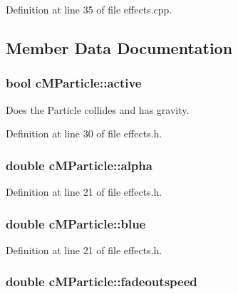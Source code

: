 Definition at line 35 of file effects.\-cpp.



\subsection{Member Data Documentation}
\hypertarget{classc_m_particle_a08fb4f55e8af895d93501ec009bb138c}{
\subsubsection[{active}]{\setlength{\rightskip}{0pt plus 5cm}bool c\-M\-Particle\-::active}}\label{classc_m_particle_a08fb4f55e8af895d93501ec009bb138c}


Does the Particle collides and has gravity. 



Definition at line 30 of file effects.\-h.

\hypertarget{classc_m_particle_abe1351cba41b5c22228f57634bb91c94}{
\subsubsection[{alpha}]{\setlength{\rightskip}{0pt plus 5cm}double c\-M\-Particle\-::alpha}}\label{classc_m_particle_abe1351cba41b5c22228f57634bb91c94}


Definition at line 21 of file effects.\-h.

\hypertarget{classc_m_particle_a33cefdbb5990e03af063388f34c64f1d}{
\subsubsection[{blue}]{\setlength{\rightskip}{0pt plus 5cm}double c\-M\-Particle\-::blue}}\label{classc_m_particle_a33cefdbb5990e03af063388f34c64f1d}


Definition at line 21 of file effects.\-h.

\hypertarget{classc_m_particle_a6c9e380fd94779a7494c217096751156}{
\subsubsection[{fadeoutspeed}]{\setlength{\rightskip}{0pt plus 5cm}double c\-M\-Particle\-::fadeoutspeed}}\label{classc_m_particle_a6c9e380fd94779a7494c217096751156}


